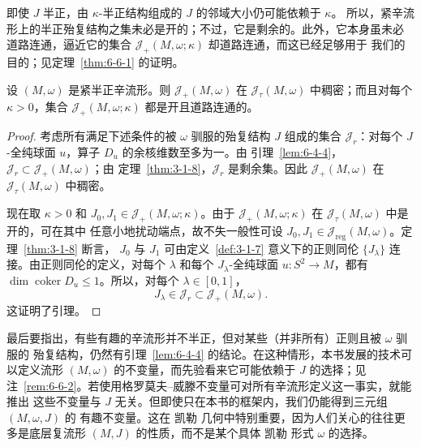 即使 $J$ 半正，由 $\kappa$-半正结构组成的 $J$ 的邻域大小仍可能依赖于 $\kappa$。
所以，紧辛流形上的半正殆复结构之集未必是开的；不过，它是剩余的。此外，它本身虽未必
道路连通，逼近它的集合 $\mathcal J_+(M,\omega;\kappa)$ 却道路连通，而这已经足够用于
我们的目的；见定理~\ref{thm:6-6-1} 的证明。

\begin{lemma}\label{lem:6-4-8}
设 $(M,\omega)$ 是紧半正辛流形。则 $\mathcal J_+(M,\omega)$ 在
$\mathcal J_\tau(M,\omega)$ 中稠密；而且对每个 $\kappa>0$，集合
$\mathcal J_+(M,\omega;\kappa)$ 都是开且道路连通的。
\end{lemma}

\begin{proof}
考虑所有满足下述条件的被 $\omega$ 驯服的殆复结构 $J$ 组成的集合
$\mathcal J_r$：对每个 $J$-全纯球面 $u$，算子 $D_u$ 的余核维数至多为一。由
引理~\ref{lem:6-4-4}，$\mathcal J_r\subset\mathcal J_+(M,\omega)$；由
定理~\ref{thm:3-1-8}，$\mathcal J_r$ 是剩余集。因此
$\mathcal J_+(M,\omega)$ 在 $\mathcal J_\tau(M,\omega)$ 中稠密。

现在取 $\kappa>0$ 和
$J_0,J_1\in\mathcal J_+(M,\omega;\kappa)$。由于
$\mathcal J_+(M,\omega;\kappa)$ 在 $\mathcal J_\tau(M,\omega)$ 中是开的，可在其中
任意小地扰动端点，故不失一般性可设
$J_0,J_1\in\mathcal J_{\mathrm{reg}}(M,\omega)$。定理~\ref{thm:3-1-8} 断言，
$J_0$ 与 $J_1$ 可由定义~\ref{def:3-1-7} 意义下的正则同伦
$\{J_\lambda\}$ 连接。由正则同伦的定义，对每个 $\lambda$ 和每个
$J_\lambda$-全纯球面 $u:S^2\to M$，都有
$\dim\operatorname{coker}D_u\le1$。所以，对每个 $\lambda\in[0,1]$，
\[
  J_\lambda\in\mathcal J_r\subset\mathcal J_+(M,\omega).
\]
这证明了引理。
\end{proof}

最后要指出，有些有趣的辛流形并不半正，但对某些（并非所有）正则且被 $\omega$ 驯服的
殆复结构，仍然有引理~\ref{lem:6-4-4} 的结论。在这种情形，本书发展的技术可以定义流形
$(M,\omega)$ 的不变量，而先验看来它可能依赖于 $J$ 的选择；见
注~\ref{rem:6-6-2}。若使用格罗莫夫--威滕不变量可对所有辛流形定义这一事实，就能推出
这些不变量与 $J$ 无关。但即使只在本书的框架内，我们仍能得到三元组 $(M,\omega,J)$ 的
有趣不变量。这在 凯勒 几何中特别重要，因为人们关心的往往更多是底层复流形
$(M,J)$ 的性质，而不是某个具体 凯勒 形式 $\omega$ 的选择。

